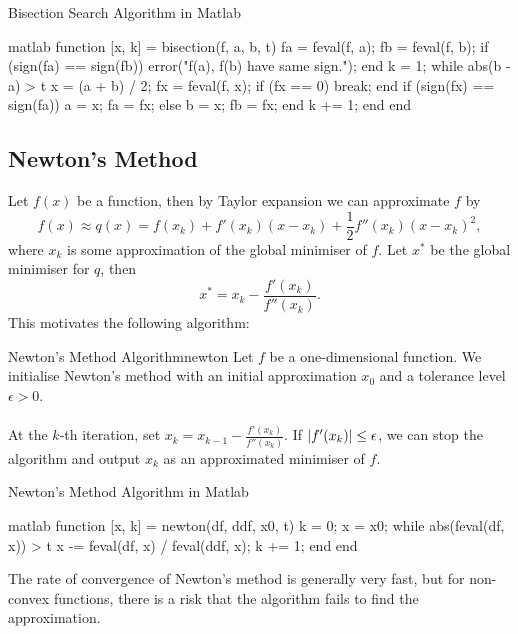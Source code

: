\documentclass[math, code]{amznotes}
\theoremstyle{remark}
\begin{document}
\begin{codebox}{Bisection Search Algorithm in Matlab}{}
    \begin{amzcode}{matlab}
function [x, k] = bisection(f, a, b, t)
    fa = feval(f, a);
    fb = feval(f, b);
    if (sign(fa) == sign(fb))
        error("f(a), f(b) have same sign.");
    end
    k = 1;
    while abs(b - a) > t
        x = (a + b) / 2;
        fx = feval(f, x);
        if (fx == 0)
            break;
        end
        if (sign(fx) == sign(fa))
            a = x; 
            fa = fx;
        else
            b = x; 
            fb = fx;
        end
        k += 1;
    end
end
    \end{amzcode}
\end{codebox}

\subsection{Newton's Method}
Let $f(x)$ be a function, then by Taylor expansion we can approximate $f$ by
\begin{equation*}
    f(x) \approx q(x) = f(x_k) + f'(x_k)(x - x_k) + \frac{1}{2}f''(x_k)(x - x_k)^2,
\end{equation*}
where $x_k$ is some approximation of the global minimiser of $f$. Let $x^*$ be the global minimiser for $q$, then
\begin{equation*}
    x^* = x_k - \frac{f'(x_k)}{f''(x_k)}.
\end{equation*}
This motivates the following algorithm:
\begin{tecbox}{Newton's Method Algorithm}{newton}
    Let $f$ be a one-dimensional function. We initialise Newton's method with an initial approximation $x_0$ and a tolerance level $\epsilon > 0$.
    \\\\
    At the $k$-th iteration, set $x_k = x_{k - 1} - \frac{f'(x_k)}{f''(x_k)}$. If ${\left\lvert {f'(x_k)} \right\rvert} \leq \epsilon$, we can stop the algorithm and output $x_k$ as an approximated minimiser of $f$.
\end{tecbox}
\begin{codebox}{Newton's Method Algorithm in Matlab}{}
    \begin{amzcode}{matlab}
function [x, k] = newton(df, ddf, x0, t)
    k = 0;
    x = x0;
    while abs(feval(df, x)) > t
        x -= feval(df, x) / feval(ddf, x);
        k += 1;
    end
end
    \end{amzcode}
\end{codebox}
The rate of convergence of Newton's method is generally very fast, but for non-convex functions, there is a risk that the algorithm fails to find the approximation.
\end{document}

